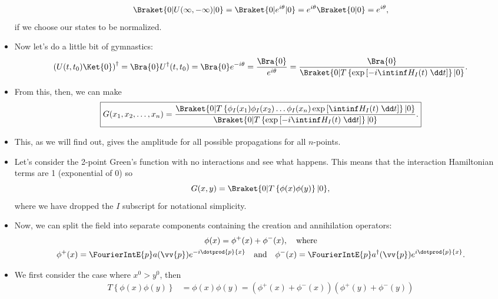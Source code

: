 \begin{itemize}
        \begin{equation*}
            \Braket{0 | U(\infty,-\infty) | 0} = \Braket{0 | e^{i\theta} | 0} = e^{i\theta} \Braket{0 | 0} = e^{i\theta},
        \end{equation*}
        if we choose our states to be normalized.
    \item Now let's do a little bit of gymnastics:
        \begin{equation*}
            \left( U(t,t_0)\Ket{0} \right)^{\dagger} = \Bra{0}U^{\dagger}(t,t_0) = \Bra{0}e^{-i\theta} = \frac{\Bra{0}}{e^{i\theta}} = \frac{\Bra{0}}{\Braket{0 | T\left\{ \exp\left[ -i\intinf H_I(t) \;\dd t \right] \right\} | 0}}.
        \end{equation*}
    \item From this, then, we can make
        \begin{equation}
            \boxed{G(x_1,x_2,\ldots,x_n) = \frac{\Braket{0 | T\left\{ \phi_I(x_1)\phi_I(x_2) \ldots \phi_I(x_n) \exp\left[ \intinf H_I(t) \;\dd t \right] \right\} | 0}}{\Braket{0 | T\left\{ \exp\left[ -i\intinf H_I(t) \;\dd t \right] \right\} | 0}}.}
        \end{equation}
    \item This, as we will find out, gives the amplitude for all possible propagations for all $n$-points.
    \item Let's consider the 2-point Green's function with no interactions and see what happens. This means that the interaction Hamiltonian terms are 1 (exponential of 0) so
        \begin{equation*}
            G(x,y) = \Braket{0 | T\left\{ \phi(x)\phi(y) \right\} | 0},
        \end{equation*}
        where we have dropped the $I$ subscript for notational simplicity.
    \item Now, we can split the field into separate components containing the creation and annihilation operators:
        \begin{gather}
            \phi(x) = \phi^+(x) + \phi^-(x), \quad \mathrm{where} \\
            \phi^+(x) = \FourierIntE{p} a(\vv{p}) e^{-i\dotprod{p}{x}} \quad \mathrm{and} \quad \phi^-(x) = \FourierIntE{p} a^{\dagger}(\vv{p}) e^{i\dotprod{p}{x}}.
        \end{gather}
    \item We first consider the case where $x^0 > y^0$, then
        \begin{align*}
            T\left\{ \phi(x)\phi(y) \right\} &= \phi(x)\phi(y) = (\phi^+(x) + \phi^-(x))(\phi^+(y) + \phi^-(y)) \\

\end{align*}
\end{itemize}
